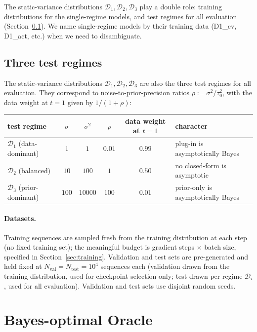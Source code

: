 \documentclass[11pt]{article}
\begin{document}
The static-variance distributions $\mathcal{D}_1, \mathcal{D}_2, \mathcal{D}_3$ play a double role: training distributions for the single-regime models, and test regimes for all evaluation (Section~\ref{sec:regimes}). We name single-regime models by their training data (D1\_cv, D1\_act, etc.) when we need to disambiguate.

\subsection{Three test regimes}
\label{sec:regimes}

The static-variance distributions $\mathcal{D}_1, \mathcal{D}_2, \mathcal{D}_3$ are also the three test regimes for all evaluation. They correspond to noise-to-prior-precision ratios $\rho := \sigma^2/\tau_0^2$, with the data weight at $t = 1$ given by $1/(1 + \rho)$:

\begin{center}
\small
\begin{tabular}{l c c c c l}
\hline
test regime & $\sigma$ & $\sigma^2$ & $\rho$ & data weight at $t = 1$ & character \\
\hline
$\mathcal{D}_1$ (data-dominant)    & $1$   & $1$     & $0.01$ & $0.99$ & plug-in is asymptotically Bayes \\
$\mathcal{D}_2$ (balanced)         & $10$  & $100$   & $1$    & $0.50$ & no closed-form is asymptotic \\
$\mathcal{D}_3$ (prior-dominant)   & $100$ & $10000$ & $100$  & $0.01$ & prior-only is asymptotically Bayes \\
\hline
\end{tabular}
\end{center}

\paragraph{Datasets.} Training sequences are sampled fresh from the training distribution at each step (no fixed training set); the meaningful budget is gradient steps $\times$ batch size, specified in Section~\ref{sec:training}. Validation and test sets are pre-generated and held fixed at $N_{\mathrm{val}} = N_{\mathrm{test}} = 10^4$ sequences each (validation drawn from the training distribution, used for checkpoint selection only; test drawn per regime $\mathcal{D}_i$, used for all evaluation). Validation and test sets use disjoint random seeds.

\section{Bayes-optimal Oracle}
\label{sec:oracle}
\end{document}
